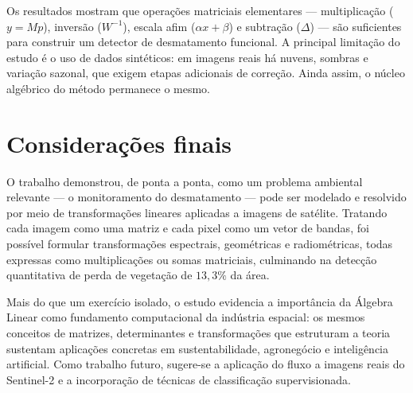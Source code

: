 \documentclass[12pt,a4paper,oneside]{article}
\renewcommand{\refname}{REFERÊNCIAS}%
\begin{document}
Os resultados mostram que operações matriciais elementares --- multiplicação
($y=Mp$), inversão ($W^{-1}$), escala afim ($\alpha x+\beta$) e subtração
($\Delta$) --- são suficientes para construir um detector de desmatamento
funcional. A principal limitação do estudo é o uso de dados sintéticos: em
imagens reais há nuvens, sombras e variação sazonal, que exigem etapas
adicionais de correção. Ainda assim, o núcleo algébrico do método permanece o
mesmo.

\section{Considerações finais}
O trabalho demonstrou, de ponta a ponta, como um problema ambiental relevante
--- o monitoramento do desmatamento --- pode ser modelado e resolvido por meio
de transformações lineares aplicadas a imagens de satélite. Tratando cada
imagem como uma matriz e cada pixel como um vetor de bandas, foi possível
formular transformações espectrais, geométricas e radiométricas, todas
expressas como multiplicações ou somas matriciais, culminando na detecção
quantitativa de perda de vegetação de $13{,}3\%$ da área.

Mais do que um exercício isolado, o estudo evidencia a importância da Álgebra
Linear como fundamento computacional da indústria espacial: os mesmos conceitos
de matrizes, determinantes e transformações que estruturam a teoria sustentam
aplicações concretas em sustentabilidade, agronegócio e inteligência
artificial. Como trabalho futuro, sugere-se a aplicação do fluxo a imagens
reais do Sentinel-2 e a incorporação de técnicas de classificação supervisionada.

\renewcommand{\refname}{REFERÊNCIAS}
{}
\end{document}
